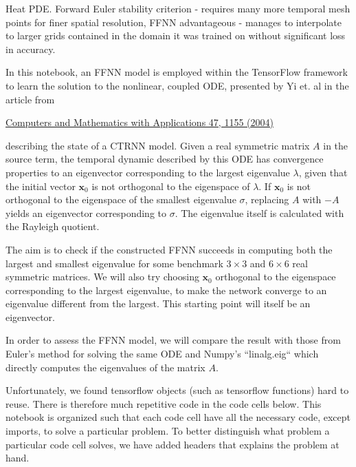 Heat PDE. Forward Euler stability criterion - requires many more temporal mesh points for finer spatial resolution, FFNN advantageous - manages to interpolate to larger grids contained in the domain it was trained on without significant loss in accuracy.





 





In this notebook, an FFNN model is employed within the TensorFlow framework to learn the solution to the nonlinear, coupled ODE, presented by Yi et. al in the article from 

\href{https://www.sciencedirect.com/science/article/pii/S0898122104901101}{Computers and Mathematics with Applications 47, 1155 (2004)}

describing the state of a CTRNN model. Given a real symmetric matrix $A$ in the source term, the temporal dynamic described by this ODE has convergence properties to an eigenvector corresponding to the largest eigenvalue $\lambda$, given that the initial vector $\mathbf{x}_0$ is not orthogonal to the eigenspace of $\lambda$. If $\mathbf{x}_0$ is not orthogonal to the eigenspace of the smallest eigenvalue $\sigma$, replacing $A$ with $-A$ yields an eigenvector corresponding to $\sigma$. The eigenvalue itself is calculated with the Rayleigh quotient.

The aim is to check if the constructed FFNN succeeds in computing both the largest and smallest eigenvalue for some benchmark $3\times 3$ and $6\times 6$ real symmetric matrices. We will also try choosing $\mathbf{x}_0$ orthogonal to the eigenspace corresponding to the largest eigenvalue, to make the network converge to an eigenvalue different from the largest. This starting point will itself be an eigenvector.

In order to assess the FFNN model, we will compare the result with those from Euler's method for solving the same ODE and Numpy's ``linalg.eig`` which directly computes the eigenvalues of the matrix $A$. 

Unfortunately, we found tensorflow objects (such as tensorflow functions) hard to reuse. There is therefore much repetitive code in the code cells below. This notebook is organized such that each code cell have all the necessary code, except imports, to solve a particular problem. To better distinguish what problem a particular code cell solves, we have added headers that explains the problem at hand.

